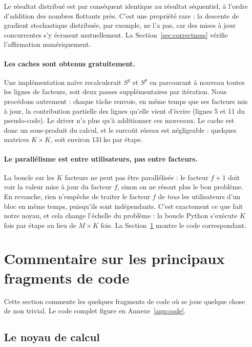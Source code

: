 \documentclass[11pt,a4paper]{article}
\begin{document}
Le résultat distribué est par conséquent identique au résultat séquentiel, à l'ordre
d'addition des nombres flottants près. C'est une propriété rare : la descente de
gradient stochastique distribuée, par exemple, ne l'a pas, car des mises à jour
concurrentes s'y écrasent mutuellement. La Section~\ref{sec:correctness} vérifie
l'affirmation numériquement.

\paragraph{Les caches sont obtenus gratuitement.} Une implémentation naïve recalculerait
$S^q$ et $S^p$ en parcourant à nouveau toutes les lignes de facteurs, soit deux passes
supplémentaires par itération. Nous procédons autrement : chaque tâche renvoie, en même
temps que ses facteurs mis à jour, la contribution partielle des lignes qu'elle vient
d'écrire (lignes 5 et 11 du pseudo-code). Le driver n'a plus qu'à additionner ces
morceaux. Le cache est donc un sous-produit du calcul, et le surcoût réseau est
négligeable : quelques matrices $K\times K$, soit environ 131\,ko par étape.

\paragraph{Le parallélisme est entre utilisateurs, pas entre facteurs.} La boucle sur
les $K$ facteurs ne peut pas être parallélisée : le facteur $f+1$ doit voir la valeur
mise à jour du facteur $f$, sinon on ne résout plus le bon problème. En revanche, rien
n'empêche de traiter le facteur $f$ de \emph{tous} les utilisateurs d'un bloc en même
temps, puisqu'ils sont indépendants. C'est exactement ce que fait notre noyau, et cela
change l'échelle du problème : la boucle Python s'exécute $K$ fois par étape au lieu de
$M\times K$ fois. La Section~\ref{sec:code} montre le code correspondant.

\section{Commentaire sur les principaux fragments de code}\label{sec:code}

Cette section commente les quelques fragments de code où se joue quelque chose de non
trivial. Le code complet figure en Annexe~\ref{app:code}.

\subsection{Le noyau de calcul}
\end{document}
